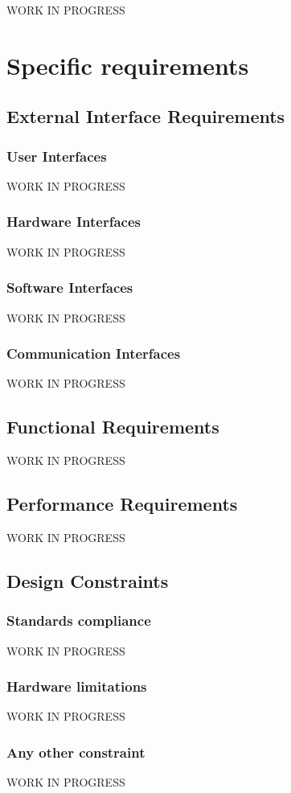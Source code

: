 \documentclass{report}
\begin{document}
				
			
		WORK IN PROGRESS
	\chapter{Specific requirements}
		\section{External Interface Requirements}
			\subsection{User Interfaces}
			WORK IN PROGRESS
			\subsection{Hardware Interfaces}
			WORK IN PROGRESS
			\subsection{Software Interfaces}
			WORK IN PROGRESS
			\subsection{Communication Interfaces}
			WORK IN PROGRESS
		\section{Functional Requirements}
		WORK IN PROGRESS
		\section{Performance Requirements}
		WORK IN PROGRESS
		\section{Design Constraints}
			\subsection{Standards compliance}
			WORK IN PROGRESS
			\subsection{Hardware limitations}
			WORK IN PROGRESS
			\subsection{Any other constraint}
			WORK IN PROGRESS
\end{document}
